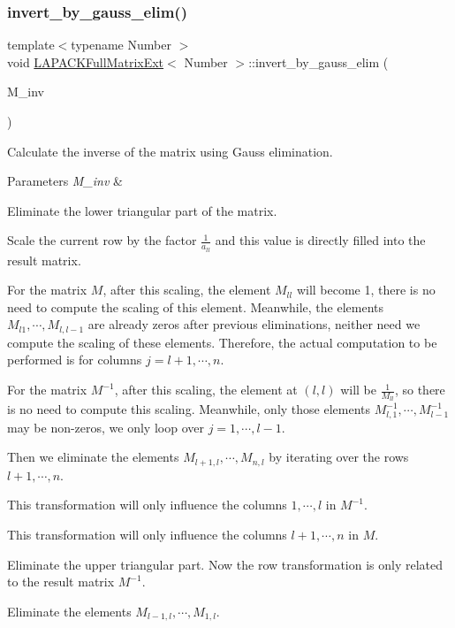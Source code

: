 \subsubsection{\texorpdfstring{invert\+\_\+by\+\_\+gauss\+\_\+elim()}{invert\_by\_gauss\_elim()}}
{\footnotesize\ttfamily template$<$typename Number $>$ \\
void \hyperlink{classLAPACKFullMatrixExt}{L\+A\+P\+A\+C\+K\+Full\+Matrix\+Ext}$<$ Number $>$\+::invert\+\_\+by\+\_\+gauss\+\_\+elim (\begin{DoxyParamCaption}\item[{\hyperlink{classLAPACKFullMatrixExt}{L\+A\+P\+A\+C\+K\+Full\+Matrix\+Ext}$<$ Number $>$ \&}]{M\+\_\+inv }\end{DoxyParamCaption})}

Calculate the inverse of the matrix using Gauss elimination. 
\begin{DoxyParams}{Parameters}
{\em M\+\_\+inv} & \\
\hline
\end{DoxyParams}
Eliminate the lower triangular part of the matrix.

Scale the current row by the factor $\frac{1}{a_{ll}}$ and this value is directly filled into the result matrix.

For the matrix $M$, after this scaling, the element $M_{ll}$ will become 1, there is no need to compute the scaling of this element. Meanwhile, the elements $M_{l1}, \cdots, M_{l,l-1}$ are already zeros after previous eliminations, neither need we compute the scaling of these elements. Therefore, the actual computation to be performed is for columns $j = l + 1, \cdots, n$.

For the matrix $M^{-1}$, after this scaling, the element at $(l, l)$ will be $\frac{1}{M_{ll}}$, so there is no need to compute this scaling. Meanwhile, only those elements $M^{-1}_{l,1}, \cdots, M^{-1}_{l-1}$ may be non-\/zeros, we only loop over $j = 1, \cdots, l - 1$.

Then we eliminate the elements $M_{l+1,l}, \cdots, M_{n,l}$ by iterating over the rows $l + 1, \cdots, n$.

This transformation will only influence the columns $1, \cdots, l$ in $M^{-1}$.

This transformation will only influence the columns $l+1, \cdots, n$ in $M$.

Eliminate the upper triangular part. Now the row transformation is only related to the result matrix $M^{-1}$.

Eliminate the elements $M_{l-1,l}, \cdots, M_{1,l}$.

